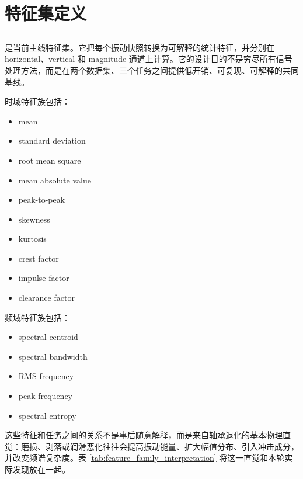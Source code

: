 \section{特征集定义}

\subsection{}

 是当前主线特征集。它把每个振动快照转换为可解释的统计特征，并分别在 horizontal、vertical 和 magnitude 通道上计算。它的设计目的不是穷尽所有信号处理方法，而是在两个数据集、三个任务之间提供低开销、可复现、可解释的共同基线。

时域特征族包括：

\begin{itemize}[leftmargin=2em]
  \item mean
  \item standard deviation
  \item root mean square
  \item mean absolute value
  \item peak-to-peak
  \item skewness
  \item kurtosis
  \item crest factor
  \item impulse factor
  \item clearance factor
\end{itemize}

频域特征族包括：

\begin{itemize}[leftmargin=2em]
  \item spectral centroid
  \item spectral bandwidth
  \item RMS frequency
  \item peak frequency
  \item spectral entropy
\end{itemize}

这些特征和任务之间的关系不是事后随意解释，而是来自轴承退化的基本物理直觉：磨损、剥落或润滑恶化往往会提高振动能量、扩大幅值分布、引入冲击成分，并改变频谱复杂度。表 \ref{tab:feature_family_interpretation} 将这一直觉和本轮实际发现放在一起。



\subsection{}

